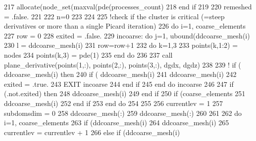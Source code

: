 \begin{DoxyCode}
217         \textcolor{keyword}{allocate}(node\_set(maxval(pde(processes\_count)%
218 \textcolor{keywordflow}{      end if}
219       
220       remeshed = .false.
221 
222       n=0
223 
224 
225       \textcolor{comment}{!check if the cluster is critical (=steep derivatives or more than a single Picard iteration) }
226       \textcolor{keywordflow}{do} i=1, coarse_elements%
227         row = 0
228         exited = .false.
229         incoarse: \textcolor{keywordflow}{do} j=1, ubound(ddcoarse_mesh(i)%
230                     l = ddcoarse_mesh(i)%
231                     row=row+1
232                     \textcolor{keywordflow}{do} k=1,3
233                       points(k,1:2) = nodes%
234                       points(k,3) = pde(1)%
235 \textcolor{keywordflow}{                    end do}
236                     
237                     \textcolor{keyword}{call }plane_derivative(points(1,:), points(2,:), points(3,:), dgdx,\textcolor{comment}{ dgdz)}
238 \textcolor{comment}{                    }
239 \textcolor{comment}{!                     if ( ddcoarse\_mesh(i)%
       then}
240                       \textcolor{keywordflow}{if} ( ddcoarse_mesh(i)%
241                       ddcoarse_mesh(i)%
242                       exited = .true.
243                       \textcolor{keywordflow}{EXIT} incoarse
244 \textcolor{keywordflow}{                    end if}
245 \textcolor{keywordflow}{        end do} incoarse
246           
247         \textcolor{keywordflow}{if} (.not.exited) \textcolor{keywordflow}{then}
248           ddcoarse_mesh(i)%
249 \textcolor{keywordflow}{        end if}
250         \textcolor{keywordflow}{if} (coarse_elements%
251           ddcoarse_mesh(i)%
252 \textcolor{keywordflow}{        end if}
253 \textcolor{keywordflow}{      end do}
254 
255       
256       currentlev = 1
257       subdomsdim = 0
258       ddcoarse_mesh(:)%
259       ddcoarse_mesh(:)%
260 
261 
262       \textcolor{keywordflow}{do} i=1, coarse_elements%
263         \textcolor{keywordflow}{if} (ddcoarse_mesh(i)%
264           ddcoarse_mesh(i)%
265           currentlev = currentlev + 1
266         \textcolor{keywordflow}{else} \textcolor{keywordflow}{if} (ddcoarse_mesh(i)%

\end{DoxyCode}
